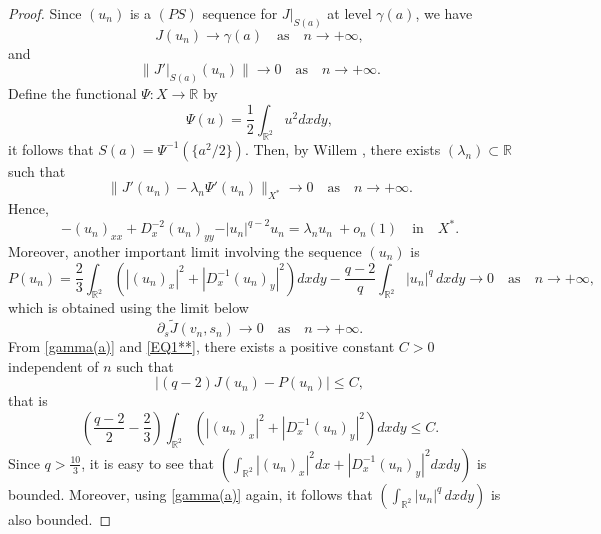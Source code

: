 \documentclass[11pt]{amsart}
\numberwithin{equation}{section}
\begin{document}
{{{\begin{proof}
    Since $(u_n)$ is a $(PS)$ sequence for $J|_{S(a)}$ at level $\gamma(a)$, we have
    \begin{equation} \label{gamma(a)}
        J(u_n) \to \gamma(a) \quad \mbox{as} \quad n \to +\infty,
    \end{equation}
    and
    {
        \begin{equation*} \label{der11}
            \|J'|_{S(a)}(u_n)\| \to 0 \quad \mbox{as} \quad n \to +\infty.
    \end{equation*}}
    Define the functional $\Psi:X \to \mathbb{R}$ by
    $$
    \Psi(u)=\frac{1}{2}\int_{\mathbb{R}^{2}}u^{2}dxdy,
    $$
    it follows that $S(a)=\Psi^{-1}(\{a^2/2\})$. Then, by Willem \cite[Proposition 5.12]{Willem}, there exists $(\lambda_n) \subset \mathbb{R}$ such that
    \begin{equation}\label{eq-J-psi}
            \|J'(u_n)-\lambda_n\Psi'(u_n)\|_{X^{*}} \to 0 \quad \mbox{as} \quad n \to +\infty.
    \end{equation}
    Hence,
    \begin{equation} \label{EQ10}
        -(u_n)_{xx}+D^{-2}_{x} (u_n)_{yy}-\vert u_n\vert^{q-2}u_n=\lambda_n u_n\ + o_n(1) \quad \mbox{in} \quad X^*.
    \end{equation}
    Moreover, another important limit involving the sequence $(u_n)$ is
    \begin{equation} \label{EQ1**}
        P(u_n)=\frac{2}{3}\int_{\mathbb{R}^{2}}\left( |(u_n)_{x}|^{2} +|D^{-1}_{x} (u_n)_{y}|^{2}\right) dx dy-\frac{q-2}{q}\int_{\mathbb{R}^2} |u_n|^q \,dxdy\to 0 \quad \mbox{as} \quad n \to +\infty,
    \end{equation}
    which is obtained using the limit below
    $$
    {\partial_s}\tilde{J}(v_n,s_n) \to 0 \quad \mbox{as} \quad n \to +\infty.
    $$
    From \eqref{gamma(a)} and  \eqref{EQ1**},  there exists a positive constant $C>0$ independent of $n$ such that
    \begin{equation} \label{BDD1}
        \vert (q-2)J(u_n)-P(u_n)\vert\leq C,
    \end{equation}
    that is
    \begin{equation} \label{BDD2}
        \left(\frac{q-2}{2}-\frac{2}{3}\right)\int_{\mathbb{R}^{2}}\left( |(u_n)_{x}|^{2} +|D^{-1}_{x} (u_n)_{y}|^{2} \right)dx dy\leq C.
    \end{equation}
    Since $q>\frac{10}{3}$, it is easy to see that $\left(\displaystyle\int_{\mathbb{R}^{2}} |(u_n)_{x}|^{2} dx+|D^{-1}_{x} (u_n)_{y}|^{2} dx dy\right)$ is bounded. Moreover, using \eqref{gamma(a)} again, it follows that $\left(\displaystyle \int_{\mathbb{R}^2} |u_n|^q \,dxdy\right)$ is also bounded.

\end{proof}}}}
\end{document}
